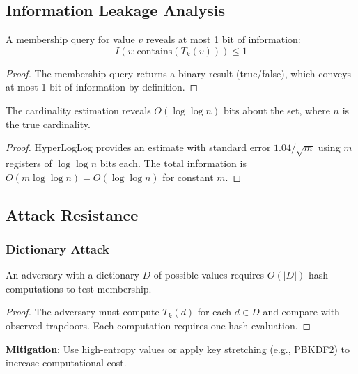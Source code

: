 \documentclass[../main_comprehensive.tex]{subfiles}
\begin{document}
\subsection{Information Leakage Analysis}

\begin{lemma}
A membership query for value $v$ reveals at most 1 bit of information:
$$I(v; \text{contains}(T_k(v))) \leq 1$$
\end{lemma}

\begin{proof}
The membership query returns a binary result (true/false), which conveys at most 1 bit of information by definition.
\end{proof}

\begin{theorem}
The cardinality estimation reveals $O(\log \log n)$ bits about the set, where $n$ is the true cardinality.
\end{theorem}

\begin{proof}
HyperLogLog provides an estimate with standard error $1.04/\sqrt{m}$ using $m$ registers of $\log \log n$ bits each. The total information is $O(m \log \log n) = O(\log \log n)$ for constant $m$.
\end{proof}

\subsection{Attack Resistance}

\subsubsection{Dictionary Attack}

\begin{theorem}
An adversary with a dictionary $D$ of possible values requires $O(|D|)$ hash computations to test membership.
\end{theorem}

\begin{proof}
The adversary must compute $T_k(d)$ for each $d \in D$ and compare with observed trapdoors. Each computation requires one hash evaluation.
\end{proof}

\textbf{Mitigation}: Use high-entropy values or apply key stretching (e.g., PBKDF2) to increase computational cost.
\end{document}
